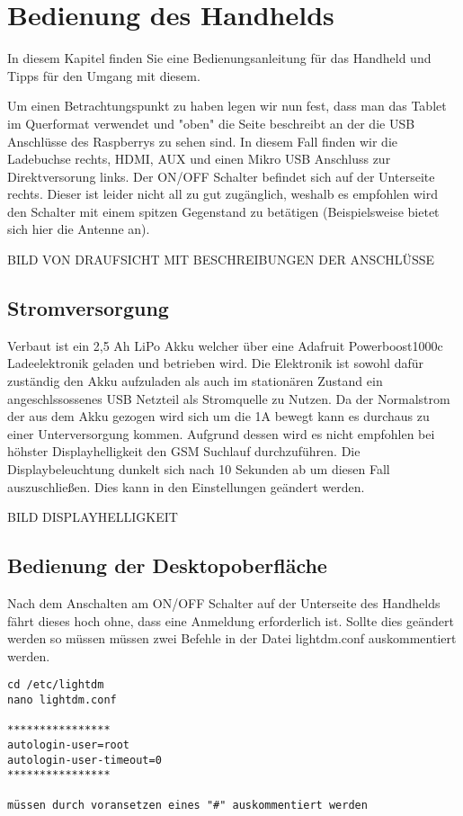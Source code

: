 %
%
\chapter{Bedienung des Handhelds}
In diesem Kapitel finden Sie eine Bedienungsanleitung für das Handheld und Tipps für den Umgang mit diesem.

Um einen Betrachtungspunkt zu haben legen wir nun fest, dass man das Tablet im Querformat verwendet und "oben" die Seite beschreibt an der die USB Anschlüsse des Raspberrys zu sehen sind. In diesem Fall finden wir die Ladebuchse rechts, HDMI, AUX und einen Mikro USB Anschluss zur Direktversorung links. Der ON/OFF Schalter befindet sich auf der Unterseite rechts. Dieser ist leider nicht all zu gut zugänglich, weshalb es empfohlen wird den Schalter mit einem spitzen Gegenstand zu betätigen (Beispielsweise bietet sich hier die Antenne an).

BILD VON DRAUFSICHT MIT BESCHREIBUNGEN DER ANSCHLÜSSE 

\section{Stromversorgung}

Verbaut ist ein 2,5 Ah LiPo Akku welcher über eine Adafruit Powerboost1000c Ladeelektronik geladen und betrieben wird. Die Elektronik ist sowohl dafür zuständig den Akku aufzuladen als auch im stationären Zustand ein angeschlssossenes USB Netzteil als Stromquelle zu Nutzen. Da der Normalstrom der aus dem Akku gezogen wird sich um die 1A bewegt kann es durchaus zu einer Unterversorgung kommen. Aufgrund dessen wird es nicht empfohlen bei höhster Displayhelligkeit den GSM Suchlauf durchzuführen. Die Displaybeleuchtung dunkelt sich nach 10 Sekunden ab um diesen Fall auszuschließen. Dies kann in den Einstellungen geändert werden. 

BILD DISPLAYHELLIGKEIT

\section{Bedienung der Desktopoberfläche}

Nach dem Anschalten am ON/OFF Schalter auf der Unterseite des Handhelds fährt dieses hoch ohne, dass eine Anmeldung erforderlich ist. Sollte dies geändert werden so müssen müssen zwei Befehle in der Datei lightdm.conf auskommentiert werden. 
\begin{verbatim}
cd /etc/lightdm
nano lightdm.conf

****************
autologin-user=root
autologin-user-timeout=0
****************

müssen durch voransetzen eines "#" auskommentiert werden
\end{verbatim}


